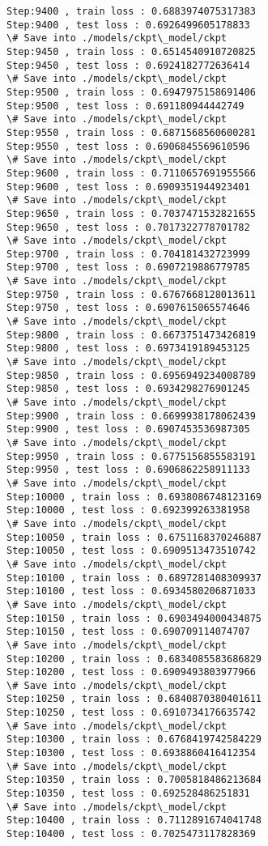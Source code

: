 \documentclass[11pt]{article}
\begin{document}
\begin{Verbatim}[commandchars=\\\{\}]
Step:9400 , train loss : 0.6883974075317383
Step:9400 , test loss : 0.6926499605178833
\# Save into ./models/ckpt\_model/ckpt
Step:9450 , train loss : 0.6514540910720825
Step:9450 , test loss : 0.6924182772636414
\# Save into ./models/ckpt\_model/ckpt
Step:9500 , train loss : 0.6947975158691406
Step:9500 , test loss : 0.691180944442749
\# Save into ./models/ckpt\_model/ckpt
Step:9550 , train loss : 0.6871568560600281
Step:9550 , test loss : 0.6906845569610596
\# Save into ./models/ckpt\_model/ckpt
Step:9600 , train loss : 0.7110657691955566
Step:9600 , test loss : 0.6909351944923401
\# Save into ./models/ckpt\_model/ckpt
Step:9650 , train loss : 0.7037471532821655
Step:9650 , test loss : 0.7017322778701782
\# Save into ./models/ckpt\_model/ckpt
Step:9700 , train loss : 0.704181432723999
Step:9700 , test loss : 0.6907219886779785
\# Save into ./models/ckpt\_model/ckpt
Step:9750 , train loss : 0.6767668128013611
Step:9750 , test loss : 0.6907615065574646
\# Save into ./models/ckpt\_model/ckpt
Step:9800 , train loss : 0.6673751473426819
Step:9800 , test loss : 0.6973419189453125
\# Save into ./models/ckpt\_model/ckpt
Step:9850 , train loss : 0.6956949234008789
Step:9850 , test loss : 0.6934298276901245
\# Save into ./models/ckpt\_model/ckpt
Step:9900 , train loss : 0.6699938178062439
Step:9900 , test loss : 0.6907453536987305
\# Save into ./models/ckpt\_model/ckpt
Step:9950 , train loss : 0.6775156855583191
Step:9950 , test loss : 0.6906862258911133
\# Save into ./models/ckpt\_model/ckpt
Step:10000 , train loss : 0.6938086748123169
Step:10000 , test loss : 0.692399263381958
\# Save into ./models/ckpt\_model/ckpt
Step:10050 , train loss : 0.6751168370246887
Step:10050 , test loss : 0.6909513473510742
\# Save into ./models/ckpt\_model/ckpt
Step:10100 , train loss : 0.6897281408309937
Step:10100 , test loss : 0.6934580206871033
\# Save into ./models/ckpt\_model/ckpt
Step:10150 , train loss : 0.6903494000434875
Step:10150 , test loss : 0.690709114074707
\# Save into ./models/ckpt\_model/ckpt
Step:10200 , train loss : 0.6834085583686829
Step:10200 , test loss : 0.6909493803977966
\# Save into ./models/ckpt\_model/ckpt
Step:10250 , train loss : 0.6840870380401611
Step:10250 , test loss : 0.6910734176635742
\# Save into ./models/ckpt\_model/ckpt
Step:10300 , train loss : 0.6768419742584229
Step:10300 , test loss : 0.6938860416412354
\# Save into ./models/ckpt\_model/ckpt
Step:10350 , train loss : 0.7005818486213684
Step:10350 , test loss : 0.692528486251831
\# Save into ./models/ckpt\_model/ckpt
Step:10400 , train loss : 0.7112891674041748
Step:10400 , test loss : 0.7025473117828369

\end{Verbatim}
\end{document}
